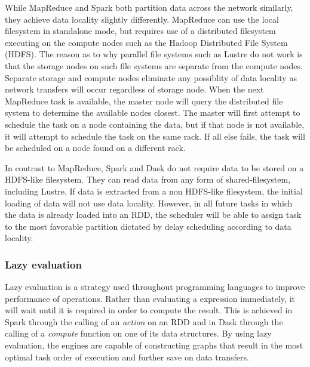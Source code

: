 \documentclass{report}
\begin{document}
                    While MapReduce and Spark both partition data across the 
                    network similarly, they achieve data locality slightly 
                    differently. MapReduce can use the local filesystem in 
                    standalone mode, but requires use of a distributed 
                    filesystem executing on the compute nodes such as the 
                    Hadoop Distributed File System (HDFS). The reason as to why
                    parallel file systems such as Lustre do not work is that 
                    the storage nodes on such file systems are separate from 
                    the compute nodes. Separate storage and compute nodes 
                    eliminate any possiblity of data locality as network 
                    transfers will occur regardless of storage node. When the 
                    next MapReduce task is available, the master node will 
                    query the distributed file system to determine the 
                    available nodes closest. The master will first attempt to
                    schedule the task on a node containing the data, but if 
                    that node is not available, it will attempt to schedule
                    the task on the same rack. If all else fails, the task will
                    be scheduled on a node found on a different rack. 

                    In contrast to MapReduce, Spark and Dask do not require 
                    data to 
                    be stored on a HDFS-like filesystem. They can read data 
                    from
                    any form of shared-filesystem, including Lustre. If data 
                    is extracted from a non HDFS-like filesystem, the initial 
                    loading of data will not use data locality. However, in all
                    future tasks in which the data is already loaded into an 
                    RDD, the scheduler will be able to assign task to the most
                    favorable partition dictated by delay scheduling according
                    to data locality.

                    
                \subsubsection{Lazy evaluation}

                    Lazy evaluation is a strategy used throughout programming languages
                    to improve performance of operations. Rather than
                    evaluating a expression immediately, it will wait until it 
                    is required in order to compute the result. This is 
                    achieved in Spark through the calling of an \textit{action}
                    on an RDD and in Dask through the calling of a 
                    \textit{compute} function on one of its data structures.
                    By using lazy evaluation, the engines are capable of 
                    constructing graphs that result in the most optimal
                    task order of execution and further save on data transfers. 
\end{document}
